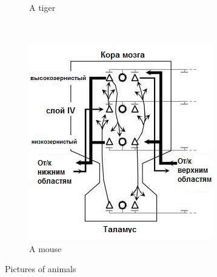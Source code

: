 \documentclass[a4paper,14pt]{report}
\begin{document}
\begin{figure}
\begin{subfigure}[b]{0.3\textwidth}
			\caption{A tiger}
			\label{fig:tiger}
		\end{subfigure}
		~ %
		\begin{subfigure}[b]{0.3\textwidth}
			\includegraphics[width=\textwidth]{dehaene_gwt_c}
			\caption{A mouse}
			\label{fig:mouse}
		\end{subfigure}
		\caption{Pictures of animals}\label{fig:animals}
	\end{figure}
\end{document}
